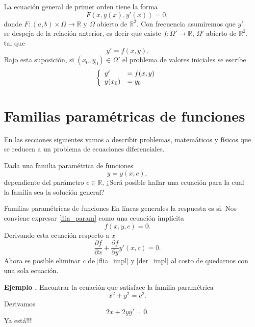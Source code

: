 \documentclass{article}
\newcommand{\rr}{\mathbb{R}}
\newcounter{ejemplo_cont}
\newenvironment{ejemplo}{\noindent\textbf{Ejemplo  \arabic{ejemplo_cont}.} }{\addtocounter{ejemplo_cont}{1}}
\begin{document}
\begin{definicion} La ecuación general de primer orden tiene la forma
\[
F(x,y(x),y'(x))=0,
\]
donde $F:(a,b)\times \Omega\to\rr$ y $\Omega$ abierto de $\rr^2$. Con frecuencia asumiremos que $y'$ se despeja de la relación anterior, es decir que existe $f:\Omega'\to\rr$,
$\Omega'$ abierto de $\rr^2$, tal que
\[y'=f(x,y).\]
Bajo esta suposición, si $(x_0,y_0)\in\Omega'$ el problema de valores iniciales se escribe
\[\left\{\begin{array}{l l}
	    y'&=f(x,y)\\
	    y(x_0)&=y_0
         \end{array}\right.
\]
\end{definicion}



\section{Familias paramétricas de funciones}

En las secciones siguientes vamos a describir problemas, matemáticos y físicos que se reducen a un problema de ecuaciones diferenciales.


\begin{problema}
Dada una familia paramétrica de funciones
 \begin{equation}\label{flia_param}y=y(x,c),\end{equation}
 dependiente del parámetro $c\in\rr$, ¿Será posible hallar una ecuación para la cual la familia sea la solución general?
\end{problema}


{Familias paramétricas de funciones}
En líneas generales la respuesta es si. Nos conviene expresar \eqref{flia_param} como una ecuación implícita
\begin{equation}\label{flia_impl}f(x,y,c)=0.\end{equation}
Derivando esta ecuación respecto a $x$
\begin{equation}\label{der_impl}
 \frac{\partial f}{\partial x}+\frac{\partial f}{\partial y}y'(x,c)=0.
\end{equation}
Ahora es posible eliminar $c$ de \eqref{flia_impl} y \eqref{der_impl} al costo de quedarnos con una sola ecuación.




\begin{ejemplo} Encontrar la ecuación que satisface la familia paramétrica
\[x^2+y^2=c^2.\]
Derivamos
\[2x+2yy'=0.\]
Ya está!!!
\end{ejemplo}
\end{document}
